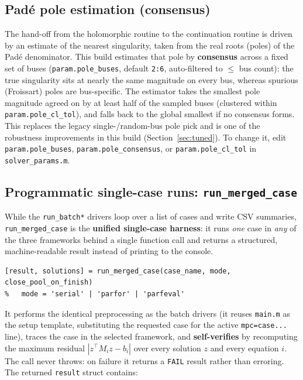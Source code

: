 \documentclass[11pt,a4paper]{article}
\newcommand{\code}[1]{\texttt{#1}}
\begin{document}
\subsection{Pad\'e pole estimation (consensus)}\label{sec:pole}
The hand-off from the holomorphic routine to the continuation routine is driven by an
estimate of the nearest singularity, taken from the real roots (poles) of the Pad\'e
denominator. This build estimates that pole by \textbf{consensus} across a fixed set of
buses (\code{param.pole_buses}, default \code{2:6}, auto-filtered to $\le$ bus count): the
true singularity sits at nearly the same magnitude on every bus, whereas spurious
(Froissart) poles are bus-specific. The estimator takes the smallest pole magnitude agreed
on by at least half of the sampled buses (clustered within \code{param.pole_cl_tol}), and
falls back to the global smallest if no consensus forms. This replaces the legacy
single-/random-bus pole pick and is one of the robustness improvements in this build
(Section~\ref{sec:tuned}). To change it, edit \code{param.pole_buses},
\code{param.pole_consensus}, or \code{param.pole_cl_tol} in \code{solver_params.m}.

\subsection{Programmatic single-case runs: \code{run_merged_case}}
While the \code{run_batch*} drivers loop over a list of cases and write CSV summaries,
\code{run_merged_case} is the \textbf{unified single-case harness}: it runs \emph{one}
case in \emph{any} of the three frameworks behind a single function call and returns a
structured, machine-readable result instead of printing to the console.
\begin{lstlisting}[style=mat]
[result, solutions] = run_merged_case(case_name, mode, close_pool_on_finish)
%   mode = 'serial' | 'parfor' | 'parfeval'
\end{lstlisting}
It performs the identical preprocessing as the batch drivers (it reuses \code{main.m} as
the setup template, substituting the requested case for the active \code{mpc=case...}
line), traces the case in the selected framework, and \textbf{self-verifies} by
recomputing the maximum residual $|z^\top M_i z - b_i|$ over every solution $z$ and every
equation $i$. The call never throws: on failure it returns a \code{FAIL} result rather
than erroring. The returned \code{result} struct contains:
\end{document}
